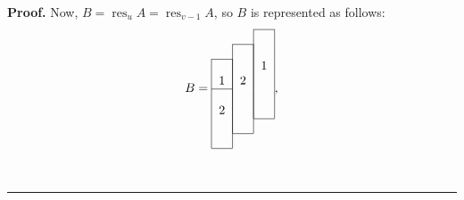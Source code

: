 \documentclass[numbers=enddot,12pt,final,onecolumn,notitlepage]{scrartcl}%
\theoremstyle{definition}
\newenvironment{proof}[1][Proof]{\noindent\textbf{#1.} }{\ \rule{0.5em}{0.5em}}
\begin{document}
\begin{proof}
Now, $B = \operatorname{res}_u A = \operatorname{res}_{v-1}A$, so
$B$ is represented as follows:
\[
B=%
\begin{tabular}{ccc}
\cline{3-3} & & \multicolumn{1}{|c|}{} \\
\cline{2-2} & \multicolumn{1}{|c|}{} & \multicolumn{1}{|c|}{} \\
\cline{1-1} \multicolumn{1}{|c|}{} & \multicolumn{1}{|c|}{} & \multicolumn
{1}{|c|}{1} \\
\multicolumn{1}{|c|}{1} & \multicolumn{1}{|c|}{2} & \multicolumn{1}{|c|}{} \\
\cline{1-1} \multicolumn{1}{|c|}{} & \multicolumn{1}{|c|}{} & \multicolumn
{1}{|c|}{} \\
\multicolumn{1}{|c|}{2} & \multicolumn{1}{|c|}{} & \multicolumn{1}{|c|}{} \\
\cline{3-3} \multicolumn{1}{|c|}{} & \multicolumn{1}{|c|}{} \\
\cline{2-2} \multicolumn{1}{|c|}{} \\
\cline{1-1}
\end{tabular}%
,
\]

\end{proof}
\end{document}
